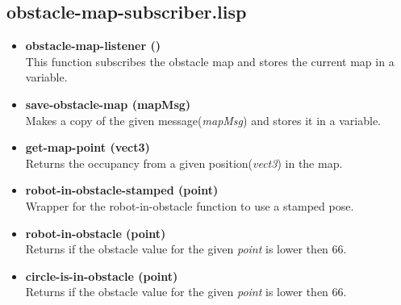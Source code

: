 \documentclass[main.tex]{subfiles}
\begin{document}
        \subsection{obstacle-map-subscriber.lisp}
        \begin{itemize}
            \item \textbf{obstacle-map-listener ()} \\
            This function subscribes the obstacle map and stores the current map in a variable.
            \item \textbf{save-obstacle-map (mapMsg)} \\
            Makes a copy of the given message(\textit{mapMsg}) and stores it in a variable.
            \item \textbf{get-map-point (vect3)} \\
            Returns the occupancy from a given position(\textit{vect3}) in the map.
            \item \textbf{robot-in-obstacle-stamped (point)} \\
            Wrapper for the robot-in-obstacle function to use a stamped pose.
            \item \textbf{robot-in-obstacle (point)} \\
            Returns if the obstacle value for the given \textit{point} is lower then 66.
            \item \textbf{circle-is-in-obstacle (point)} \\
            Returns if the obstacle value for the given \textit{point} is lower then 66.
        \end{itemize}
\end{document}

